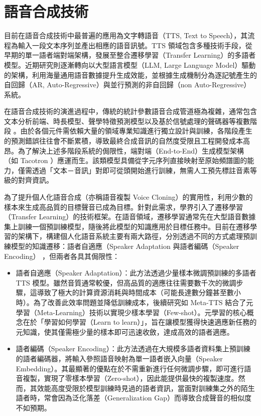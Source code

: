 \section{語音合成技術}
目前在語音合成技術中最普遍的應用為文字轉語音（TTS, Text to Speech），其流程為輸入一段文本序列並產出相應的語音訊號。TTS 領域包含多種技術手段，從早期的單一語者端對端架構，發展至整合遷移學習（Transfer Learning）的多語者模型。近期研究則逐漸轉向以大型語言模型（LLM, Large Language Model）驅動的架構，利用海量通用語音數據提升生成效能，並根據生成機制分為逐記號產生的自回歸（AR, Auto-Regressive）與並行預測的非自回歸（non Auto-Regressive）系統。

在語音合成技術的演進過程中，傳統的統計參數語音合成管道極為複雜，通常包含文本分析前端、時長模型、聲學特徵預測模型以及基於信號處理的聲碼器等複數階段 \cite{zen2016fast}。由於各個元件需依賴大量的領域專業知識進行獨立設計與訓練，各階段產生的預測錯誤往往會不斷累積，導致最終合成音訊的自然度受限且工程開發成本高昂。為了解決上述多階段系統的侷限性，端對端（End-to-End）生成模型架構（如 Tacotron \cite{wang2017tacotron}）應運而生。該類模型具備從字元序列直接映射至原始頻譜圖的能力，僅需透過「文本－音訊」對即可從頭開始進行訓練，無需人工預先標註音素等級的對齊資訊。

為了提升個人化語音合成（亦稱語音複製 Voice Cloning）的實用性，利用少數的樣本來生成高品質的目標聲音已成為目標。針對此需求，學界引入了遷移學習（Transfer Learning）的技術框架。在語音領域，遷移學習通常先在大型語音數據集上訓練一個預訓練模型，隨後將此模型的知識應用於目標任務中。目前在遷移學習的架構下，構建個人化語音系統主要有兩大路徑，分別透過不同的方式處理預訓練模型的知識遷移：語者自適應（Speaker Adaptation{\color{red} \cite{chen2021adaspeech, huang2022metatts}} 與語者編碼（Speaker Encoding）{\color{red} \cite{casanova2024xtts, chen2024f5tts, leng2024fishspeech, zhou2025indextts2}}，但兩者各具其侷限性：

\begin{itemize}
    \item 語者自適應（Speaker Adaptation）：此方法透過少量樣本微調預訓練的多語者 TTS 模型。雖然音質通常較優，但高品質的適應往往需要數千次的微調步驟，這導致了極大的計算資源消耗與時間成本（可能長達數分鐘甚至數小時）。為了改善此效率問題並降低訓練成本，後續研究如 Meta-TTS \cite{huang2022metatts} 結合了元學習（Meta-Learning）技術以實現少樣本學習（Few-shot）。元學習的核心概念在於「學習如何學習（Learn to learn）」，旨在讓模型獲得快速適應新任務的元知識，使其僅需極少量的樣本即可迅速收斂，達成高效的語者適應。
    \item 語者編碼（Speaker Encoding）：{\color{red}此方法透過在大規模多語者資料集上預訓練的語者編碼器，將輸入參照語音映射為單一語者嵌入向量（Speaker Embedding）}。其最顯著的優點在於不需重新進行任何微調步驟，即可進行語音複製，實現了零樣本學習（Zero-shot），因此能提供最快的複製速度。然而，其效能高度受限於模型訓練時見過的語者資訊，當面對訓練集之外的陌生語者時，常會因為泛化落差（Generalization Gap）而導致合成聲音的相似度不如預期。
\end{itemize}

